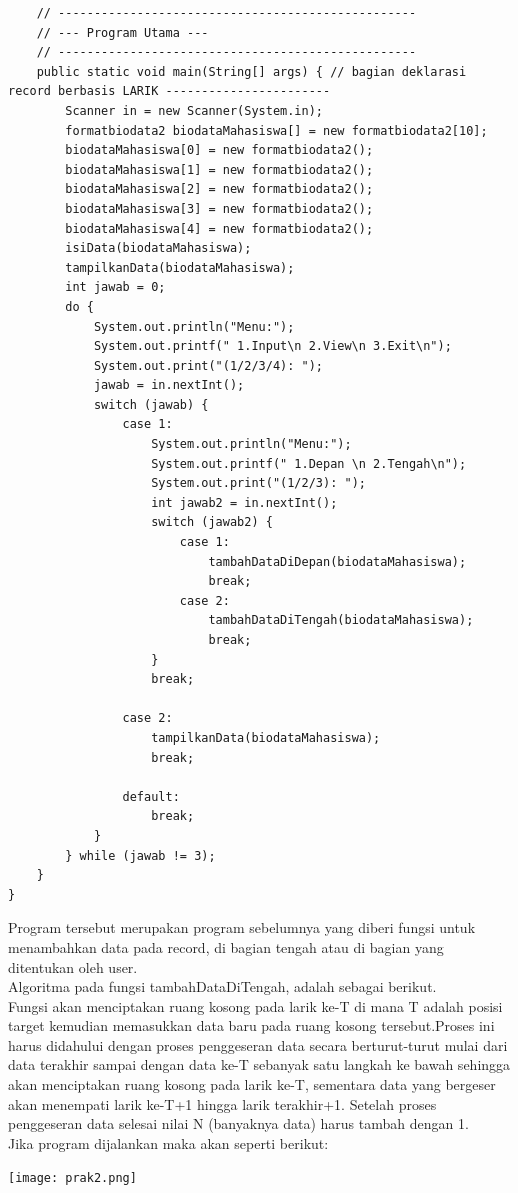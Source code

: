 \documentclass[a4paper,12pt]{article}
\begin{document}
\begin{lstlisting}
    // --------------------------------------------------
    // --- Program Utama ---
    // --------------------------------------------------
    public static void main(String[] args) { // bagian deklarasi record berbasis LARIK -----------------------
        Scanner in = new Scanner(System.in);
        formatbiodata2 biodataMahasiswa[] = new formatbiodata2[10];
        biodataMahasiswa[0] = new formatbiodata2();
        biodataMahasiswa[1] = new formatbiodata2();
        biodataMahasiswa[2] = new formatbiodata2();
        biodataMahasiswa[3] = new formatbiodata2();
        biodataMahasiswa[4] = new formatbiodata2();
        isiData(biodataMahasiswa);
        tampilkanData(biodataMahasiswa);
        int jawab = 0;
        do {
            System.out.println("Menu:");
            System.out.printf(" 1.Input\n 2.View\n 3.Exit\n");
            System.out.print("(1/2/3/4): ");
            jawab = in.nextInt();
            switch (jawab) {
                case 1:
                    System.out.println("Menu:");
                    System.out.printf(" 1.Depan \n 2.Tengah\n");
                    System.out.print("(1/2/3): ");
                    int jawab2 = in.nextInt();
                    switch (jawab2) {
                        case 1:
                            tambahDataDiDepan(biodataMahasiswa);
                            break;
                        case 2:
                            tambahDataDiTengah(biodataMahasiswa);
                            break;
                    }
                    break;

                case 2:
                    tampilkanData(biodataMahasiswa);
                    break;

                default:
                    break;
            }
        } while (jawab != 3);
    }
}
\end{lstlisting}
Program tersebut merupakan program sebelumnya yang diberi fungsi untuk menambahkan data pada record, di bagian tengah
atau di bagian yang ditentukan oleh user.\\
Algoritma pada fungsi tambahDataDiTengah, adalah sebagai berikut.\\
Fungsi akan menciptakan  ruang kosong pada larik ke-T di mana T adalah posisi target kemudian memasukkan data baru pada
ruang kosong tersebut.Proses ini harus didahului dengan proses penggeseran data secara berturut-turut mulai dari data
terakhir sampai dengan data ke-T sebanyak satu langkah ke bawah sehingga akan menciptakan ruang kosong pada larik
ke-T, sementara data yang bergeser akan menempati larik ke-T+1 hingga larik terakhir+1. Setelah proses penggeseran data
selesai nilai N (banyaknya data) harus tambah dengan 1.\\
Jika program dijalankan maka akan seperti berikut:
\begin{center}
    \texttt{[image: prak2.png]} 
\end{center}
\end{document}
